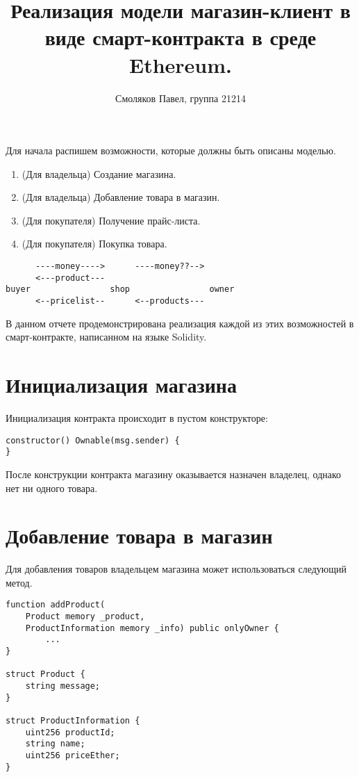 \documentclass{article}
\title{Реализация модели магазин-клиент в виде смарт-контракта в среде Ethereum.}
\date{}
\author{Смоляков Павел, группа 21214}
\begin{document}
\maketitle

Для начала распишем возможности, которые должны быть описаны моделью.
\begin{enumerate}[-]
    \item (Для владельца) Создание магазина.
    \item (Для владельца) Добавление товара в магазин.
    \item (Для покупателя) Получение прайс-листа.
    \item (Для покупателя) Покупка товара.
\end{enumerate}


\begin{lstlisting}
      ----money---->      ----money??-->
      <---product---
buyer                shop                owner
      <--pricelist--      <--products---
\end{lstlisting}

В данном отчете продемонстрирована реализация каждой из этих возможностей в смарт-контракте, написанном на языке Solidity.

\section{Инициализация магазина}
Инициализация контракта происходит в пустом конструкторе:
\begin{lstlisting}
constructor() Ownable(msg.sender) {
}    
\end{lstlisting}
После конструкции контракта магазину оказывается назначен владелец, однако нет ни одного товара.

\section{Добавление товара в магазин}
Для добавления товаров владельцем магазина может использоваться следующий метод.
\begin{lstlisting}
function addProduct(
    Product memory _product, 
    ProductInformation memory _info) public onlyOwner {
        ... 
}

struct Product {
    string message;
}

struct ProductInformation {
    uint256 productId;
    string name;
    uint256 priceEther;
}
\end{lstlisting}

\begin{lstlisting}

\end{lstlisting}
    
\end{document}
